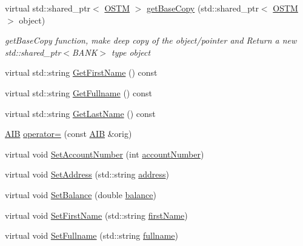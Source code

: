 \begin{DoxyCompactItemize}
\item 
virtual std\+::shared\+\_\+ptr$<$ \hyperlink{class_o_s_t_m}{O\+S\+TM} $>$ \hyperlink{class_a_i_b_a987107f3d7a04790f84c1e7eeee37575_a987107f3d7a04790f84c1e7eeee37575}{get\+Base\+Copy} (std\+::shared\+\_\+ptr$<$ \hyperlink{class_o_s_t_m}{O\+S\+TM} $>$ object)
\begin{DoxyCompactList}\small\item\em get\+Base\+Copy function, make deep copy of the object/pointer and Return a new std\+::shared\+\_\+ptr$<$\+B\+A\+N\+K$>$ type object \end{DoxyCompactList}\item 
virtual std\+::string \hyperlink{class_a_i_b_aa0833919c1c211481560cd88cb5b381b_aa0833919c1c211481560cd88cb5b381b}{Get\+First\+Name} () const 
\item 
virtual std\+::string \hyperlink{class_a_i_b_a4fbad1d62d84d47e78b2b7065be14942_a4fbad1d62d84d47e78b2b7065be14942}{Get\+Fullname} () const 
\item 
virtual std\+::string \hyperlink{class_a_i_b_a1b09db7268734beeaf6a9e7e9d8feb02_a1b09db7268734beeaf6a9e7e9d8feb02}{Get\+Last\+Name} () const 
\item 
\hyperlink{class_a_i_b}{A\+IB} \hyperlink{class_a_i_b_a77b6f74ea3ef39cb1ccb916db7a48740_a77b6f74ea3ef39cb1ccb916db7a48740}{operator=} (const \hyperlink{class_a_i_b}{A\+IB} \&orig)
\item 
virtual void \hyperlink{class_a_i_b_ae582677d2d890f1728dedb9f43965df6_ae582677d2d890f1728dedb9f43965df6}{Set\+Account\+Number} (int \hyperlink{class_a_i_b_aafc08efeec5b8c800c32ee32f20603a7_aafc08efeec5b8c800c32ee32f20603a7}{account\+Number})
\item 
virtual void \hyperlink{class_a_i_b_ab5fd22fbbc0ea75a022aaeb7174fc450_ab5fd22fbbc0ea75a022aaeb7174fc450}{Set\+Address} (std\+::string \hyperlink{class_a_i_b_ae6a67cc33d1e5fa83a52a238e45ca3dc_ae6a67cc33d1e5fa83a52a238e45ca3dc}{address})
\item 
virtual void \hyperlink{class_a_i_b_ac286e13b8cf985bc88ce356b0eaada81_ac286e13b8cf985bc88ce356b0eaada81}{Set\+Balance} (double \hyperlink{class_a_i_b_a3c8d637bd997c1f062d844a88e2559ba_a3c8d637bd997c1f062d844a88e2559ba}{balance})
\item 
virtual void \hyperlink{class_a_i_b_a671e44bdbf1286d97d7a22295177dd2e_a671e44bdbf1286d97d7a22295177dd2e}{Set\+First\+Name} (std\+::string \hyperlink{class_a_i_b_a869f72057cb63ebf0cfd257069e15c7c_a869f72057cb63ebf0cfd257069e15c7c}{first\+Name})
\item 
virtual void \hyperlink{class_a_i_b_a03def15426e627042951369ea18b97f6_a03def15426e627042951369ea18b97f6}{Set\+Fullname} (std\+::string \hyperlink{class_a_i_b_a818b0cc283af23127c067fb3fc751058_a818b0cc283af23127c067fb3fc751058}{fullname})

\end{DoxyCompactItemize}
